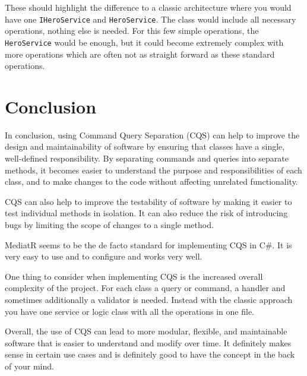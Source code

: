\documentclass[11pt,conference]{IEEEtran}
\begin{document}
These should highlight the difference to a classic architecture where you would have one \texttt{IHeroService} and \texttt{HeroService}.
The class would include all necessary operations, nothing else is needed.
For this few simple operations, the \texttt{HeroService} would be enough, but it could become extremely complex with more operations which are often not as straight forward as these standard operations.

\section{Conclusion}

In conclusion, using Command Query Separation (CQS) can help to improve the design and maintainability of software by ensuring that classes have a single, well-defined responsibility. By separating commands and queries into separate methods, it becomes easier to understand the purpose and responsibilities of each class, and to make changes to the code without affecting unrelated functionality.

CQS can also help to improve the testability of software by making it easier to test individual methods in isolation. It can also reduce the risk of introducing bugs by limiting the scope of changes to a single method.

MediatR seems to be the de facto standard for implementing CQS in C\#.
It is very easy to use and to configure and works very well.

One thing to consider when implementing CQS is the increased overall complexity of the project.
For each class a query or command, a handler and sometimes additionally a validator is needed.
Instead with the classic approach you have one service or logic class with all the operations in one file.

Overall, the use of CQS can lead to more modular, flexible, and maintainable software that is easier to understand and modify over time.
It definitely makes sense in certain use cases and is definitely good to have the concept in the back of your mind.

\printbibliography
\end{document}
